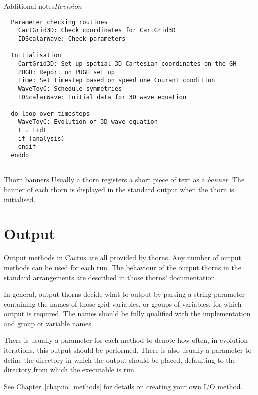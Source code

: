 \begin{cactuspart}{Additional notes}{}{$Revision$}
\begin{Lentry}
\begin{verbatim}
  Parameter checking routines
    CartGrid3D: Check coordinates for CartGrid3D
    IDScalarWave: Check parameters

  Initialisation
    CartGrid3D: Set up spatial 3D Cartesian coordinates on the GH
    PUGH: Report on PUGH set up
    Time: Set timestep based on speed one Courant condition
    WaveToyC: Schedule symmetries
    IDScalarWave: Initial data for 3D wave equation

  do loop over timesteps
    WaveToyC: Evolution of 3D wave equation
    t = t+dt
    if (analysis)
    endif
  enddo
----------------------------------------------------------------------
\end{verbatim}

\item [Thorn banners]
        Usually a thorn registers a short piece of text as a \emph{banner}.
        The banner of each thorn is displayed in the standard output when
        the thorn is initialised.

\end{Lentry}


\section{Output}
Output methods in Cactus are all provided by thorns.
Any number of output methods can be used for each run.
The behaviour of the output thorns in the
standard arrangements are described in those thorns' documentation.

In general, output thorns decide what to output by parsing a string parameter
containing the names of those grid variables, or groups of variables, for which
output is required. The names should be fully qualified with the
implementation and group or variable names.

There is usually a parameter for each method to denote how often, in evolution
iterations, this output should be performed.  There is also usually a parameter
to define the directory in which the output should be placed, defaulting to the
directory from which the executable is run.

See Chapter~\ref{chap:io_methods} for details on creating your own I/O method.



\end{cactuspart}
